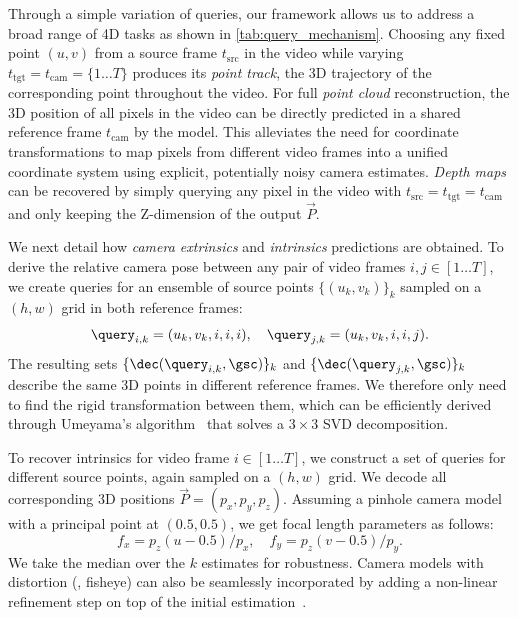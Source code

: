 Through a simple variation of queries, our framework allows us to address a broad range of 4D tasks as shown in \cref{tab:query_mechanism}.
Choosing any fixed point $(u, v)$ from a source frame $t_\text{src}$ in the video while varying $t_\text{tgt} = t_\text{cam} = \{1\ldots T\}$ produces its \emph{point track}, the 3D trajectory of the corresponding point throughout the video.
For full \emph{point cloud} reconstruction, the 3D position of all pixels in the video can be directly predicted in a shared reference frame $t_\text{cam}$ by the model.
This alleviates the need for coordinate transformations to map pixels from different video frames
into a unified coordinate system using explicit, potentially noisy camera estimates.
\emph{Depth maps} can be recovered by simply querying any pixel in the video with $t_\text{src}=t_\text{tgt}=t_\text{cam}$ and only keeping the Z-dimension of the output $\vec{P}$.

We next detail how \emph{camera extrinsics} and \emph{intrinsics} predictions are obtained.
To derive the relative camera pose between any pair of video frames $i,j\in[1\ldots T]$, we create queries for an ensemble of source points $\{(u_k, v_k)\}_k$ sampled on a $(h,w)$ grid in both reference frames:
\begin{equation*}
\query_{i,k} = (u_k, v_k, i, i, i),\quad
\query_{j,k} = (u_k, v_k, i, i, j).
\end{equation*}
The resulting sets $\{\dec(\query_{i,k}, \gsc)\}_k$ and $\{\dec(\query_{j,k}, \gsc)\}_k$ describe the same 3D points in different reference frames.
We therefore only need to find the rigid transformation between them, which can be efficiently derived through Umeyama's algorithm~\cite{umeyama1991least} that solves a $3{\times}3$ SVD decomposition.

To recover intrinsics for video frame $i\in[1\ldots T]$, we construct a set of queries for different source points, again sampled on a $(h,w)$ grid.
We decode all corresponding 3D positions $\vec{P}=(p_x, p_y, p_z)$.
Assuming a pinhole camera model with a principal point at $(0.5, 0.5)$, we get focal length parameters as follows:
\begin{equation*}
    f_x {=} p_z(u - 0.5)/p_x,\quad
    f_y {=} p_z(v - 0.5)/p_y.
\end{equation*}
We take the median over the $k$ estimates for robustness.
Camera models with distortion (\eg, fisheye) can also be seamlessly incorporated by adding a non-linear refinement step on top of the initial estimation~\cite{zhang2002flexible}.

